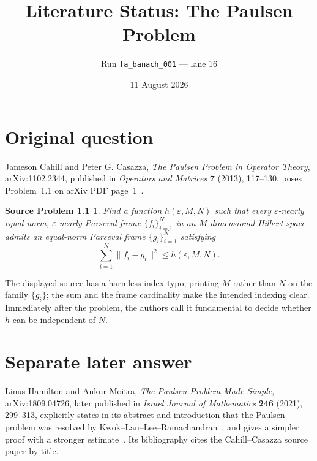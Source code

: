 \documentclass[11pt]{article}
\title{Literature Status: The Paulsen Problem}
\author{Run \texttt{fa\_banach\_001} --- lane 16}
\date{11 August 2026}
\newtheorem*{question}{Source Problem 1.1}
\begin{document}
\maketitle

\begin{center}
\end{center}

\section{Original question}

Jameson Cahill and Peter G. Casazza,
\emph{The Paulsen Problem in Operator Theory}, arXiv:1102.2344,
published in \emph{Operators and Matrices} \textbf{7} (2013), 117--130,
poses Problem~1.1 on arXiv PDF page~1~\cite{source}.

\begin{question}
Find a function $h(\varepsilon,M,N)$ such that every
$\varepsilon$-nearly equal-norm, $\varepsilon$-nearly Parseval frame
$\{f_i\}_{i=1}^{N}$ in an $M$-dimensional Hilbert space admits an
equal-norm Parseval frame $\{g_i\}_{i=1}^{N}$ satisfying
\[
  \sum_{i=1}^{N}\lVert f_i-g_i\rVert^{2}
  \leq h(\varepsilon,M,N).
\]
\end{question}

The displayed source has a harmless index typo, printing $M$ rather than
$N$ on the family $\{g_i\}$; the sum and the frame cardinality make the
intended indexing clear.  Immediately after the problem, the authors call
it fundamental to decide whether $h$ can be independent of $N$.

\section{Separate later answer}

Linus Hamilton and Ankur Moitra,
\emph{The Paulsen Problem Made Simple}, arXiv:1809.04726, later published
in \emph{Israel Journal of Mathematics} \textbf{246} (2021), 299--313,
explicitly states in its abstract and introduction that the Paulsen problem
was resolved by Kwok--Lau--Lee--Ramachandran~\cite{kllr}, and gives a simpler
proof with a stronger estimate~\cite{answerpaper}.  Its bibliography cites
the Cahill--Casazza source paper by title.
\end{document}
